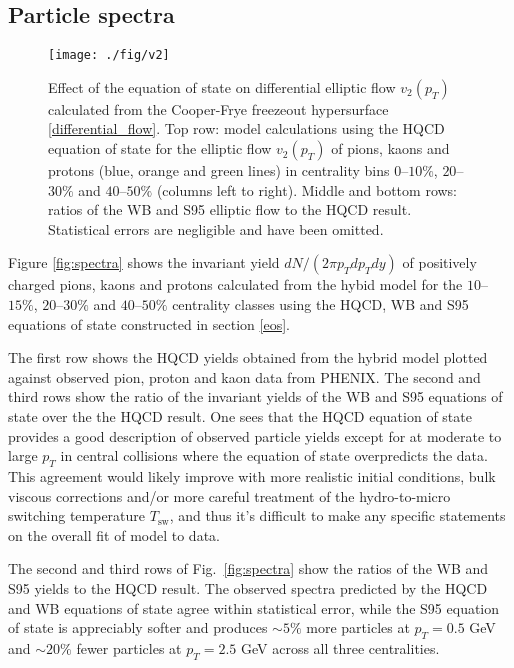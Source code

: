 \documentclass[aps,prc,reprint,amsmath,nofootinbib,superscriptaddress]{revtex4-1}
\begin{document}
\subsection{Particle spectra}
\label{spectra}

\begin{figure*}[t]
  \texttt{[image: ./fig/v2]}
  \caption{
    \label{fig:v2} Effect of the equation of state on differential elliptic flow $v_2(p_T)$ calculated from the Cooper-Frye freezeout hypersurface \eqref{differential_flow}.
    Top row: model calculations using the HQCD equation of state for the elliptic flow $v_2(p_T)$  of pions, kaons and protons (blue, orange and green lines) 
    in centrality bins $0$--$10\%$, $20$--$30\%$ and $40$--$50\%$ (columns left to right). Middle and bottom rows: ratios of the WB and S95 elliptic flow to 
    the HQCD result. Statistical errors are negligible and have been omitted.
  }
\end{figure*}

Figure \ref{fig:spectra} shows the invariant yield $dN/(2\pi p_T dp_T dy)$ of positively charged pions, kaons and protons calculated from the hybid model for the $10$--$15\%$, $20$--$30\%$
and $40$--$50\%$ centrality classes using the HQCD, WB and S95 equations of state constructed in section \ref{eos}. 

The first row shows the HQCD yields obtained from the hybrid model plotted against observed pion, proton and kaon data from PHENIX. The second and third rows show the ratio of the invariant yields of the WB and S95 equations of state over the the HQCD result. One sees that the HQCD equation of state provides a good description of observed particle yields except for at moderate to large $p_T$ in central collisions where the equation of state overpredicts the data. This agreement would likely improve with more realistic initial conditions, bulk viscous corrections and/or more careful treatment of the hydro-to-micro switching temperature $T_\text{sw}$, and thus it's difficult to make any specific statements on the overall fit of model to data. 

The second and third rows of Fig.~\ref{fig:spectra} show the ratios of the WB and S95 yields to the HQCD result. The observed spectra predicted by the HQCD and WB equations of state agree within statistical error, while the S95 equation of state is appreciably softer and produces $\sim\!5\%$ more particles at $p_T = 0.5$ GeV and $\sim\!20\%$ fewer particles at $p_T=2.5$ GeV across all three centralities.
\end{document}
